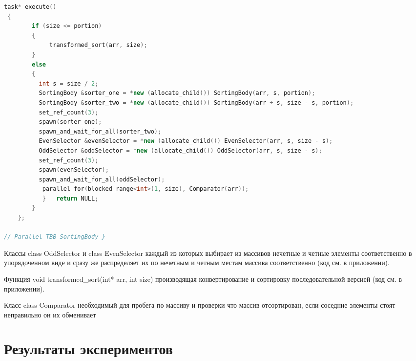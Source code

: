 \documentclass[a4paper,final]{report}
\begin{document}
\begin{spacing}{1.5}
\begin{lstlisting}[language=C++]
 task* execute()  
 {  
        if (size <= portion)   
        {    
             transformed_sort(arr, size);   
        }   
        else   
        {    
          int s = size / 2;    
          SortingBody &sorter_one = *new (allocate_child()) SortingBody(arr, s, portion);   
          SortingBody &sorter_two = *new (allocate_child()) SortingBody(arr + s, size - s, portion);    
          set_ref_count(3);    
          spawn(sorter_one);    
          spawn_and_wait_for_all(sorter_two);    
          EvenSelector &evenSelector = *new (allocate_child()) EvenSelector(arr, s, size - s);    
          OddSelector &oddSelector = *new (allocate_child()) OddSelector(arr, s, size - s);    
          set_ref_count(3);   
          spawn(evenSelector);    
          spawn_and_wait_for_all(oddSelector); 
           parallel_for(blocked_range<int>(1, size), Comparator(arr));   
           }   return NULL;
        } 
    }; 
   
// Parallel TBB SortingBody }
\end{lstlisting} 
		\par Классы class OddSelector и class EvenSelector каждый из которых выбирает из массивов нечетные и четные элементы соответственно в упорядоченном виде и сразу же распределяет их по нечетным и четным местам массива соответственно (код см. в приложении).
		\par Функция void transformed\_sort(int* arr, int size) производящая конвертирование и сортировку последовательной версией (код см. в приложении).
		\par Класс class Comparator необходимый для пробега по массиву и проверки что массив отсортирован, если соседние элементы стоят неправильно он их обменивает 
		
		\newpage
		\section{Результаты экспериментов}
		

\end{spacing}
\end{document}
